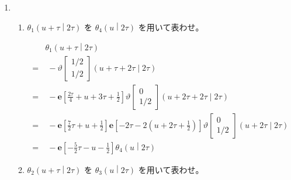 \documentclass[12pt,b5paper]{ltjsarticle}
\begin{document}
\begin{enumerate}
\begin{enumerate}
\begin{enumerate}
                    \hrulefill
             \end{enumerate}

        \item
             \begin{enumerate}
              \item $\displaystyle \theta_{1} \left(u+\tau \middle| 2\tau \right)$
                    を
                    $\displaystyle \theta_{4} \left(u \middle| 2\tau \right)$
                    を用いて表わせ。

                    \dotfill

                    \begin{align}
                     & \theta_{1} \left(u+\tau \middle| 2\tau \right)\\
                     =&\;
                     -\vartheta \begin{bmatrix} 1/2 \\ 1/2 \end{bmatrix} (u+\tau+2\tau \mid 2\tau)\\
                     =&\; -\mathbf{e}[\frac{2\tau}{4}+u+3\tau +\frac{1}{2}]
                     \vartheta \begin{bmatrix} 0 \\ 1/2 \end{bmatrix} (u+2\tau+2\tau \mid 2\tau)\\
                     =&\; -\mathbf{e}[\frac{7}{2}\tau+u +\frac{1}{2}]
                     \mathbf{e}[-2\tau-2(u+2\tau+\frac{1}{2})]
                     \vartheta \begin{bmatrix} 0 \\ 1/2 \end{bmatrix} (u+2\tau \mid 2\tau)\\
                     =&\; -\mathbf{e}[-\frac{5}{2}\tau-u-\frac{1}{2}]
                     \theta_{4} \left(u \middle| 2\tau \right)
                    \end{align}

                    \hrulefill

              \item $\displaystyle \theta_{2} \left(u+\tau \middle| 2\tau \right)$
                    を
                    $\displaystyle \theta_{3} \left(u \middle| 2\tau \right)$
                    を用いて表わせ。

                    \dotfill


\end{enumerate}
\end{enumerate}
\end{enumerate}
\end{document}
